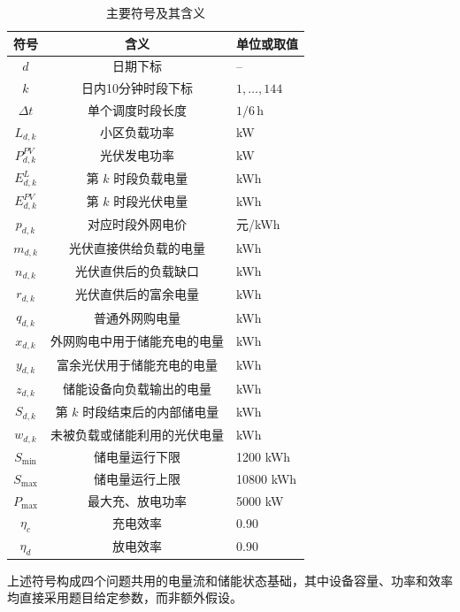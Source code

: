 \begin{table}[H]
    \centering
    \caption{主要符号及其含义}
    \begin{tabular}{ccl}
        \hline
        符号 & 含义 & 单位或取值 \\
        \hline
        $d$ & 日期下标 & -- \\
        $k$ & 日内10分钟时段下标 & $1,\ldots,144$ \\
        $\Delta t$ & 单个调度时段长度 & $1/6\,\mathrm{h}$ \\
        $L_{d,k}$ & 小区负载功率 & kW \\
        $P^{PV}_{d,k}$ & 光伏发电功率 & kW \\
        $E^L_{d,k}$ & 第 $k$ 时段负载电量 & kWh \\
        $E^{PV}_{d,k}$ & 第 $k$ 时段光伏电量 & kWh \\
        $p_{d,k}$ & 对应时段外网电价 & 元/kWh \\
        $m_{d,k}$ & 光伏直接供给负载的电量 & kWh \\
        $n_{d,k}$ & 光伏直供后的负载缺口 & kWh \\
        $r_{d,k}$ & 光伏直供后的富余电量 & kWh \\
        $q_{d,k}$ & 普通外网购电量 & kWh \\
        $x_{d,k}$ & 外网购电中用于储能充电的电量 & kWh \\
        $y_{d,k}$ & 富余光伏用于储能充电的电量 & kWh \\
        $z_{d,k}$ & 储能设备向负载输出的电量 & kWh \\
        $S_{d,k}$ & 第 $k$ 时段结束后的内部储电量 & kWh \\
        $w_{d,k}$ & 未被负载或储能利用的光伏电量 & kWh \\
        $S_{\min}$ & 储电量运行下限 & 1200 kWh \\
        $S_{\max}$ & 储电量运行上限 & 10800 kWh \\
        $P_{\max}$ & 最大充、放电功率 & 5000 kW \\
        $\eta_c$ & 充电效率 & 0.90 \\
        $\eta_d$ & 放电效率 & 0.90 \\
        \hline
    \end{tabular}
\end{table}

上述符号构成四个问题共用的电量流和储能状态基础，其中设备容量、功率和效率均直接采用题目给定参数，而非额外假设。
